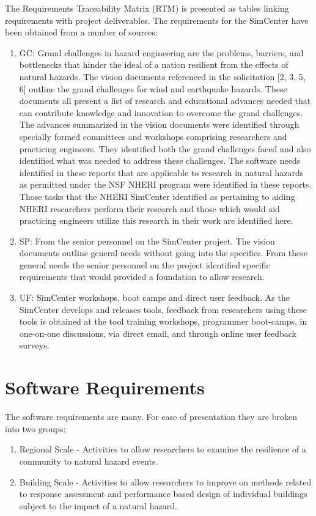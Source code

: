 \documentclass{simcenterdocumentation}
\begin{document}
The Requirements Traceability Matrix (RTM) is presented as tables linking requirements with project deliverables.  The requirements for the SimCenter have been obtained from a number of sources:
\begin{enumerate}
\item GC: Grand challenges in hazard engineering are the problems, barriers, and bottlenecks that hinder the ideal of a nation resilient from the effects of natural hazards. The vision documents referenced in the solicitation [2, 3, 5, 6] outline the grand challenges for wind and earthquake hazards. These documents all present a list of research and educational advances needed that can contribute knowledge and innovation to overcome the grand challenges. The advances summarized in the vision documents were identified through specially formed committees and workshops comprising researchers and practicing engineers. They identified both the grand challenges faced and also identified what was needed to address these challenges. The software needs identified in these reports that are applicable to research in natural hazards as permitted under the NSF NHERI program were identified in these reports. Those tasks that the NHERI SimCenter identified as pertaining to aiding NHERI researchers perform their research and those which would aid practicing engineers utilize this research in their work are identified here.
\item SP: From the senior personnel on the SimCenter project. The vision documents outline general needs without going into the specifics. From these general needs the senior personnel on the project  identified specific requirements  that would provided a foundation to allow research.
\item UF: SimCenter workshops, boot camps and direct user feedback. As the SimCenter develops and releases tools, feedback from researchers using these tools is obtained at the tool training workshops, programmer boot-camps,  in one-on-one discussions, via direct email, and through online user feedback surveys. 
\end{enumerate}  

\chapter{Software Requirements}
\label{chap:requirements}

The software requirements are many. For ease of presentation they are broken into two groups:
\begin{enumerate}
\item Regional Scale - Activities to allow researchers to examine the resilience of a community to natural hazard events.
\item Building Scale - Activities to allow researchers to improve on methods related to response assessment and performance based design of individual buildings subject to the impact of a natural hazard.
\end{enumerate}
\end{document}
